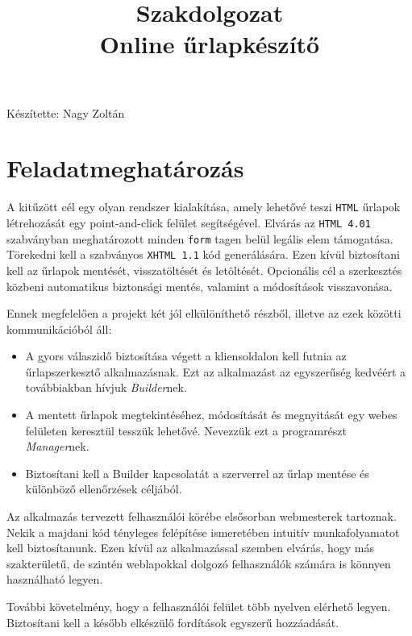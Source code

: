 \documentclass[12pt,a4paper,twoside]{article}
\title{Szakdolgozat\\\normalsize Online űrlapkészítő}
\author{} %
\begin{document}
\maketitle\thispagestyle{empty}
\vspace{17cm}
\hspace{8cm}
Készítette: Nagy Zoltán
\clearpage

\setcounter{tocdepth}{3}
\tableofcontents

\clearpage
{}
\section{Feladatmeghatározás}

A kitűzött cél egy olyan rendszer kialakítása, amely lehetővé teszi
\texttt{HTML} űrlapok létrehozását egy point-and-click felület
segítségével. Elvárás az \texttt{HTML 4.01} szabványban meghatározott minden
\texttt{form} tagen belül legális elem támogatása. Törekedni kell a szabványos
\texttt{XHTML 1.1} kód generálására. Ezen kívül biztosítani kell
az űrlapok mentését, visszatöltését és letöltését. Opcionális cél a szerkesztés
közbeni automatikus biztonsági mentés, valamint a módosítások visszavonása.

Ennek megfelelően a projekt két jól elkülöníthető részből, illetve az ezek
közötti kommunikációból áll:
\begin{itemize}
\item A gyors válaszidő biztosítása végett a kliensoldalon kell futnia az
  űrlapszerkesztő alkalmazásnak. Ezt az alkalmazást az egyszerűség kedvéért a
  továbbiakban hívjuk \textit{Builder}nek.
\item A mentett űrlapok megtekintéséhez, módosítását és megnyitását egy
  webes felületen keresztül tesszük lehetővé. Nevezzük ezt a programrészt
  \textit{Manager}nek.
\item Biztosítani kell a Builder kapcsolatát a szerverrel az űrlap mentése és
  különböző ellenőrzések céljából.
\end{itemize}

Az alkalmazás tervezett felhasználói körébe elsősorban webmesterek
tartoznak. Nekik a majdani kód tényleges felépítése ismeretében intuitív munkafolyamatot
kell biztosítanunk. Ezen kívül az alkalmazással szemben elvárás, hogy más
szakterületű, de szintén weblapokkal dolgozó felhasználók számára is könnyen
használható legyen.

További követelmény, hogy a felhasználói felület több nyelven elérhető
legyen. Biztosítani kell a később elkészülő fordítások egyszerű hozzáadását.
\end{document}
